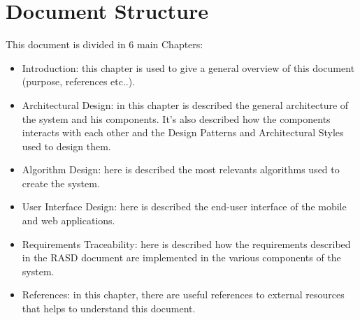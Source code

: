 \documentclass[../../../../dd.tex]{subfiles}
\begin{document}
	\section{Document Structure}
		This document is divided in 6 main Chapters:
		\begin{itemize}
			\item Introduction: this chapter is used to give a general overview of this document (purpose, references etc..).
			\item Architectural Design: in this chapter is described the general architecture of the system and his components. It's also described how the components interacts with each other and the Design Patterns and Architectural Styles used to design them.
			\item Algorithm Design: here is described the most relevants algorithms used to create the system.
			\item User Interface Design: here is described the end-user interface of the mobile and web applications.
			\item Requirements Traceability: here is described how the requirements described in the RASD document are implemented in the various components of the system.
			\item References: in this chapter, there are useful references to external resources that helps to understand this document. 
		\end{itemize}
\end{document}
